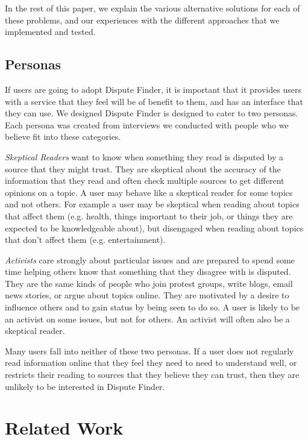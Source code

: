 \documentclass{www2010-submission}
\newcommand{\todo}[1]{}
\begin{document}
In the rest of this paper, we explain the various alternative solutions for each of these problems, and our experiences with the different approaches that we implemented and tested.


\subsection{Personas}

If users are going to adopt Dispute Finder, it is important that it provides users with a service that they feel will be of benefit to them, and has an interface that they can use. We designed Dispute Finder is designed to cater to two personas. Each persona was created from interviews we conducted with people who we believe fit into these categories.

{\it Skeptical Readers} want to know when something they read is disputed by a source that they might trust. They are skeptical about the accuracy of the information that they read and often check multiple sources to get different opinions on a topic. A user may behave like a skeptical reader for some topics and not others. For example a user may be skeptical when reading about topics that affect them (e.g. health, things important to their job, or things they are expected to be knowledgeable about), but disengaged when reading about topics that don't affect them (e.g. entertainment).

\todo{Move our personals to a ``people'' section}

\todo{Use interviews to get some actual observations here. These are just fillers.}

{\it Activists} care strongly about particular issues and are prepared to spend some time helping others know that something that they disagree with is disputed. They are the same kinds of people who join protest groups, write blogs, email news stories, or argue about topics online. They are motivated by a desire to influence others and to gain status by being seen to do so. A user is likely to be an activist on some issues, but not for others. An activist will often also be a skeptical reader.

Many users fall into neither of these two personas. If a user does not regularly read information online that they feel they need to need to understand well, or restricts their reading to sources that they believe they can trust, then they are unlikely to be interested in Dispute Finder.


\section{Related Work}
\end{document}

